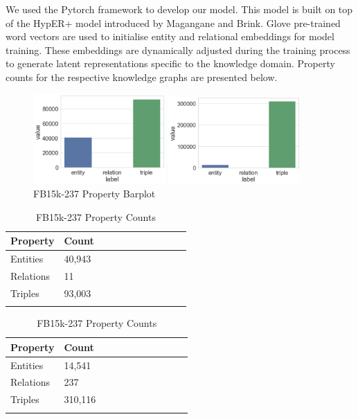 \noindent We used the Pytorch framework to develop our model. This model is built on top of the HypER+ model introduced by Magangane and Brink.  Glove pre-trained word vectors are used to initialise entity and relational embeddings for model training. These embeddings are dynamically adjusted during the training process to generate latent representations specific to the knowledge domain. Property counts for the respective knowledge graphs are presented below. \par

\begin{figure}[H]
	\parbox{.5\linewidth}{
   		\centering
    		\includegraphics[width=0.45\textwidth]{WN18RR_Counts}
		\caption{WN18RR Property Barplot}
		}
	\hfill
	\parbox{.5\linewidth}{
   		\centering
    		\includegraphics[width=0.45\textwidth]{FB15k-237_Counts}
		\caption{FB15k-237 Property Barplot}
		}
\end{figure}

\begin{table}[H]
	\parbox{.5\linewidth}{
		\centering
		\begin{tabular}{lllllllllll}
  			\textbf{Property} & \textbf{Count}  \\
  			\hline
  			Entities & 40,943  \\
  			Relations & 11  \\
  			Triples & 93,003 \\
			&
		\end{tabular}
		\caption{WN18RR Property Counts}
		}
	\hfill
	\parbox{.5\linewidth}{
		\centering
		\begin{tabular}{lllllllllll}
  			\textbf{Property} & \textbf{Count}  \\
  			\hline
  			Entities & 14,541   \\
  			Relations & 237  \\
  			Triples & 310,116  \\
			&
		\end{tabular}
		\caption{FB15k-237 Property Counts}
		}
\end{table}

